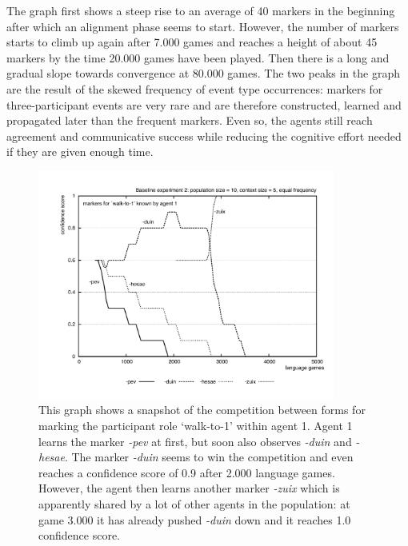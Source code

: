 The graph first shows a steep rise to an average of 40 markers in the beginning after which an alignment phase seems to start. However, the number of markers starts to climb up again after 7.000 games and reaches a height of about 45 markers by the time 20.000 games have been played. Then there is a long and gradual slope towards convergence at 80.000 games. The two peaks in the graph are the result of the skewed frequency of event type occurrences: markers for three-participant events are very rare and are therefore constructed, learned and propagated later than the frequent markers. Even so, the agents still reach agreement and communicative success while reducing the cognitive effort needed if they are given enough time.


\begin{figure}[t]
\centerline{\includegraphics[width=0.87\textwidth]{Chapter3/figs/graph-base2-comp}}
  \caption[Baseline experiment 2: snapshot of competition (equal frequency)]{This graph shows a snapshot of the competition between forms for marking the participant role `walk-to-1' within agent 1. Agent 1 learns the marker {\em -pev} at first, but soon also observes {\em -duin} and {\em -hesae}. The marker {\em -duin} seems to win the competition and even reaches a confidence score of 0.9 after 2.000 language games. However, the agent then learns another marker {\em -zuix} which is apparently shared by a lot of other agents in the population: at game 3.000 it has already pushed {\em -duin} down and it reaches 1.0 confidence score.}
   \label{f:base2-comp}
\end{figure}
